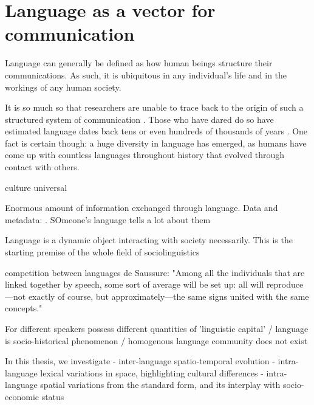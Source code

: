 \documentclass[../thesis.tex]{subfiles}
\begin{document}
\chapter{Language as a vector for communication}
\label{ch:lang_as_comm}

Language can generally be defined as how human beings structure their communications. As such, it is ubiquitous in any individual's life and in the workings of any human society.

It is so much so that researchers are unable to trace back to the origin of such a structured system of communication \cite{MullerLectureIX1861,StamInquiriesOrigin1976,GibsonOxfordHandbook2011,HauserMysteryLanguage2014}. Those who have dared do so have estimated language dates back tens or even hundreds of thousands of years \cite{NicholsOriginDispersal1998,ChomskyLanguageMind2004,BothaCradleLanguage2009,DediuAntiquityLanguage2013}. One fact is certain though: a huge diversity in language has emerged, as humans have come up with countless languages throughout history that evolved through contact with others. 

culture universal \cite{GreenbergLanguageUniversals2020,BrownDonaldHumanUniversals1991,}

Enormous amount of information exchanged through language. Data and metadata: . SOmeone's language tells a lot about them

Language is a dynamic object interacting with society necessarily. This is the starting premise of the whole field of sociolinguistics \cite{LabovSociolinguisticPatterns1973,TrudgillSociolinguisticsIntroduction2000,WardhaughIntroductionSociolinguistics2008}

\cite{LabovPrinciplesLinguistic1994,LabovPrinciplesLinguistic2001,LabovPrinciplesLinguistic2010}

competition between languages \cite{GrilloDominantLanguages1989,WardhaughLanguagesCompetition1987,BlommaertSociolinguisticsGlobalization2010}
de Saussure: "Among all the individuals that are linked together by speech, some sort of average will be set up: all will reproduce—not exactly of course, but approximately—the same signs united with the same concepts." \cite{deSaussureCourseGeneral2011}

For different speakers possess different quantities of 'linguistic capital' / language is socio-historical phenomenon / homogenous language community does not exist \cite{BourdieuLanguageSymbolic2009}

In this thesis, we investigate
- inter-language spatio-temporal evolution
- intra-language lexical variations in space, highlighting cultural differences
- intra-language spatial variations from the standard form, and its interplay with socio-economic status
\end{document}

